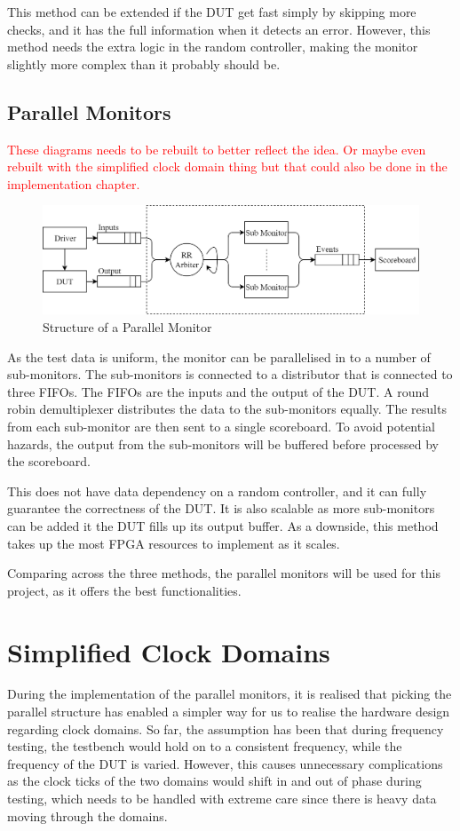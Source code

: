 This method can be extended if the DUT get fast simply by skipping more checks, and it has the full information when it detects an error.
However, this method needs the extra logic in the random controller, making the monitor slightly more complex than it probably should be.

\subsection{Parallel Monitors}

\textcolor{red}{These diagrams needs to be rebuilt to better reflect the idea. Or maybe even rebuilt with the simplified clock domain thing but that could also be done in the implementation chapter.}

\begin{figure}[H]
  \centering
  \includegraphics[width=15cm]{img/ParMon}
  \caption{Structure of a Parallel Monitor}
  \label{ParMon}
\end{figure}

As the test data is uniform, the monitor can be parallelised in to a number of sub-monitors.
The sub-monitors is connected to a distributor that is connected to three FIFOs.
The FIFOs are the inputs and the output of the DUT.
A round robin demultiplexer distributes the data to the sub-monitors equally.
The results from each sub-monitor are then sent to a single scoreboard.
To avoid potential hazards, the output from the sub-monitors will be buffered before processed by the scoreboard.

This does not have data dependency on a random controller, and it can fully guarantee the correctness of the DUT.
It is also scalable as more sub-monitors can be added it the DUT fills up its output buffer.
As a downside, this method takes up the most FPGA resources to implement as it scales.

Comparing across the three methods, the parallel monitors will be used for this project, as it offers the best functionalities.

\section{Simplified Clock Domains}
During the implementation of the parallel monitors, it is realised that picking the parallel structure has enabled a simpler way for us to realise the hardware design regarding clock domains.
So far, the assumption has been that during frequency testing, the testbench would hold on to a consistent frequency, while the frequency of the DUT is varied.
However, this causes unnecessary complications as the clock ticks of the two domains would shift in and out of phase during testing, which needs to be handled with extreme care since there is heavy data moving through the domains.

